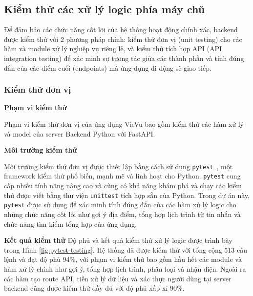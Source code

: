 
\subsection{Kiểm thử các xử lý logic phía máy chủ}

Để đảm bảo các chức năng cốt lõi của hệ thống hoạt động chính xác, backend được kiểm thử với 2 phương pháp chính: kiểm thử đơn vị (unit testing) cho các hàm và module xử lý nghiệp vụ riêng lẻ, và kiểm thử tích hợp API (API integration testing) để xác minh sự tương tác giữa các thành phần và tính đúng đắn của các điểm cuối (endpoints) mà ứng dụng di động sẽ giao tiếp.

\subsubsection{Kiểm thử đơn vị}

\textbf{Phạm vi kiểm thử}

\noindent Phạm vi kiểm thử đơn vị của ứng dụng VieVu bao gồm kiểm thử các hàm xử lý và model của server Backend Python với FastAPI. 

\noindent
\textbf{Môi trường kiểm thử}

\noindent Môi trường kiểm thử đơn vị được thiết lập bằng cách sử dụng \texttt{pytest}~\cite{pytest}, một framework kiểm thử phổ biến, mạnh mẽ và linh hoạt cho Python. \texttt{pytest} cung cấp nhiều tính năng nâng cao và cũng có khả năng khám phá và chạy các kiểm thử được viết bằng thư viện \texttt{unittest} tích hợp sẵn của Python. Trong dự án này, \texttt{pytest} được sử dụng để xác minh tính đúng đắn của các hàm xử lý logic cho những chức năng cốt lõi như gợi ý địa điểm, tổng hợp lịch trình từ tin nhắn và chức năng tìm kiếm tổng hợp của ứng dụng.

\noindent
\textbf{Kết quả kiểm thử}
\noindent Độ phủ và kết quả kiểm thử xử lý logic được trình bày trong Hình \ref{fig:pytest-testing}. Hệ thống đã được kiểm thử với tổng cộng 513 câu lệnh và đạt độ phủ 94\%, với phạm vi kiểm thử bao gồm hầu hết các module và hàm xử lý chính như gợi ý, tổng hợp lịch trình, phân loại và nhận diện. Ngoài ra các hàm tạo route API, tiền xử lý dữ liệu và xác thực người dùng tại server backend cũng dược kiểm thử đầy đủ với độ phủ xấp xỉ 90\%.


